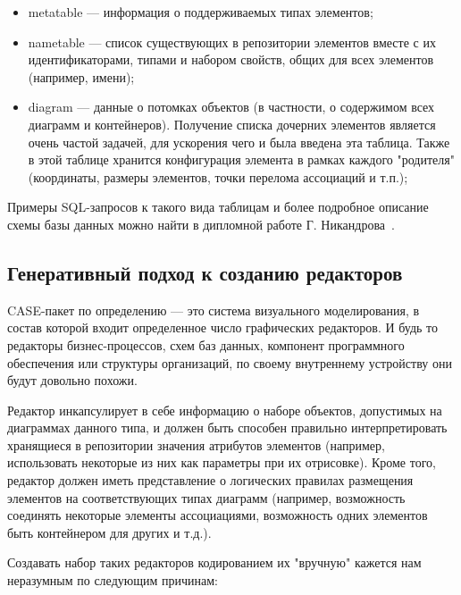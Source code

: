 \documentclass[a5paper]{article}
\begin{document}
\begin{itemize}
  \item metatable --- информация о поддерживаемых типах элементов;
  \item nametable --- список существующих в репозитории
        элементов вместе с их идентификаторами, типами и набором свойств, общих
        для всех элементов (например, имени);
  \item diagram --- данные о потомках объектов (в
        частности, о содержимом всех диаграмм и контейнеров). Получение списка
        дочерних элементов является очень частой задачей, для ускорения чего и
        была введена эта таблица. Также в этой таблице хранится конфигурация
        элемента в рамках каждого "родителя" (координаты, размеры элементов,
        точки перелома ассоциаций и т.п.);
\end{itemize}

Примеры SQL-запросов к такого вида таблицам
и более подробное описание схемы базы данных можно найти в дипломной
работе Г. Никандрова~\cite{nikandrov}.

\subsection{Генеративный подход к созданию редакторов}

CASE-пакет по определению --- это система
визуального моделирования, в состав которой входит определенное число
графических редакторов. И будь то редакторы бизнес-процессов, схем баз
данных, компонент программного обеспечения или структуры организаций,
по своему внутреннему устройству они будут довольно похожи.

Редактор инкапсулирует в себе информацию о наборе объектов, допустимых
на диаграммах данного типа, и должен быть способен правильно
интерпретировать хранящиеся в репозитории значения атрибутов элементов
(например, использовать некоторые из них как параметры при их
отрисовке). Кроме того, редактор должен иметь представление о логических правилах размещения
элементов на соответствующих типах диаграмм (например, возможность
соединять некоторые элементы ассоциациями, возможность одних элементов
быть контейнером для других и т.д.).

Создавать набор таких редакторов кодированием их "вручную" кажется нам
неразумным по следующим причинам:
\end{document}
